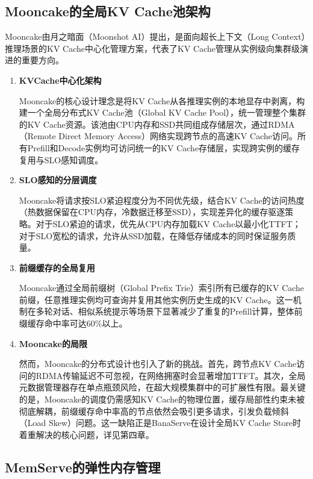 \subsection{Mooncake的全局KV Cache池架构}

Mooncake\cite{qin2024mooncake}由月之暗面（Moonshot AI）提出，是面向超长上下文（Long Context）推理场景的KV Cache中心化管理方案，代表了KV Cache管理从实例级向集群级演进的重要方向。

\begin{enumerate}
    
\item \textbf{KVCache中心化架构}

Mooncake\cite{qin2024mooncake}的核心设计理念是将KV Cache从各推理实例的本地显存中剥离，构建一个全局分布式KV Cache池（Global KV Cache Pool），统一管理整个集群的KV Cache资源。该池由CPU内存和SSD共同组成存储层次，通过RDMA（Remote Direct Memory Access）网络实现跨节点的高速KV Cache访问。所有Prefill和Decode实例均可访问统一的KV Cache存储层，实现跨实例的缓存复用与SLO感知调度。

\item \textbf{SLO感知的分层调度}

Mooncake将请求按SLO紧迫程度分为不同优先级，结合KV Cache的访问热度（热数据保留在CPU内存，冷数据迁移至SSD），实现差异化的缓存驱逐策略。对于SLO紧迫的请求，优先从CPU内存加载KV Cache以最小化TTFT；对于SLO宽松的请求，允许从SSD加载，在降低存储成本的同时保证服务质量。

\item \textbf{前缀缓存的全局复用}

Mooncake通过全局前缀树（Global Prefix Trie）索引所有已缓存的KV Cache前缀，任意推理实例均可查询并复用其他实例历史生成的KV Cache。这一机制在多轮对话、相似系统提示等场景下显著减少了重复的Prefill计算，整体前缀缓存命中率可达60\%以上。

\item \textbf{Mooncake的局限}

然而，Mooncake的分布式设计也引入了新的挑战。首先，跨节点KV Cache访问的RDMA传输延迟不可忽视，在网络拥塞时会显著增加TTFT。其次，全局元数据管理器存在单点瓶颈风险，在超大规模集群中的可扩展性有限。最关键的是，Mooncake的调度仍需感知KV Cache的物理位置，缓存局部性约束未被彻底解耦，前缀缓存命中率高的节点依然会吸引更多请求，引发负载倾斜（Load Skew）问题。这一缺陷正是BanaServe\cite{he2025banaserve}在设计全局KV Cache Store时着重解决的核心问题，详见第四章。

\end{enumerate}

\subsection{MemServe的弹性内存管理}

